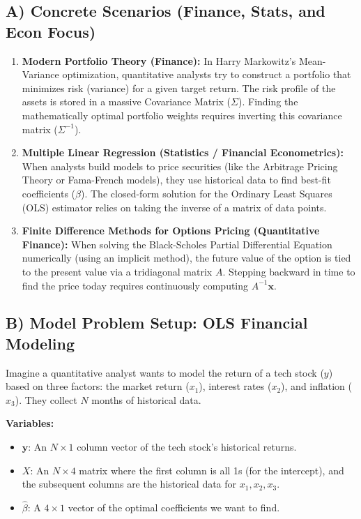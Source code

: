 \documentclass[11pt]{article}
\begin{document}
\subsection{A) Concrete Scenarios (Finance, Stats, and Econ Focus)}
\begin{enumerate}
    \item \textbf{Modern Portfolio Theory (Finance):} In Harry Markowitz's Mean-Variance optimization, quantitative analysts try to construct a portfolio that minimizes risk (variance) for a given target return. The risk profile of the assets is stored in a massive Covariance Matrix ($\Sigma$). Finding the mathematically optimal portfolio weights requires inverting this covariance matrix ($\Sigma^{-1}$). 
    
    \item \textbf{Multiple Linear Regression (Statistics / Financial Econometrics):} When analysts build models to price securities (like the Arbitrage Pricing Theory or Fama-French models), they use historical data to find best-fit coefficients ($\beta$). The closed-form solution for the Ordinary Least Squares (OLS) estimator relies on taking the inverse of a matrix of data points.
    
    \item \textbf{Finite Difference Methods for Options Pricing (Quantitative Finance):} When solving the Black-Scholes Partial Differential Equation numerically (using an implicit method), the future value of the option is tied to the present value via a tridiagonal matrix $A$. Stepping backward in time to find the price today requires continuously computing $A^{-1}\mathbf{x}$.
\end{enumerate}

\subsection{B) Model Problem Setup: OLS Financial Modeling}
Imagine a quantitative analyst wants to model the return of a tech stock ($y$) based on three factors: the market return ($x_1$), interest rates ($x_2$), and inflation ($x_3$). They collect $N$ months of historical data.

\textbf{Variables:}
\begin{itemize}
    \item $\mathbf{y}$: An $N \times 1$ column vector of the tech stock's historical returns.
    \item $X$: An $N \times 4$ matrix where the first column is all 1s (for the intercept), and the subsequent columns are the historical data for $x_1, x_2, x_3$.
    \item $\hat{\beta}$: A $4 \times 1$ vector of the optimal coefficients we want to find.
\end{itemize}
\end{document}
